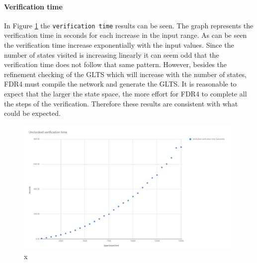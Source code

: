 \paragraph{Verification time}
In Figure \ref{fig:unclocked_verification} the \texttt{verification time} results can be seen. The graph represents the verification time in seconds for each increase in the input range. As can be seen the verification time increase exponentially with the input values. Since the number of states visited is increasing linearly it can seem odd that the verification time does not follow that same pattern. However, besides the refinement checking of the GLTS which will increase with the number of states, FDR4 must compile the network and generate the GLTS. It is reasonable to expect that the larger the state space, the more effort for FDR4 to complete all the steps of the verification. Therefore these results are consistent with what could be expected.
\begin{figure}
    \includegraphics[width=0.98\textwidth]{./figures/15-11-2018/unclocked_verification_time.jpg}
\caption{x}
\label{fig:unclocked_verification}
\end{figure}

